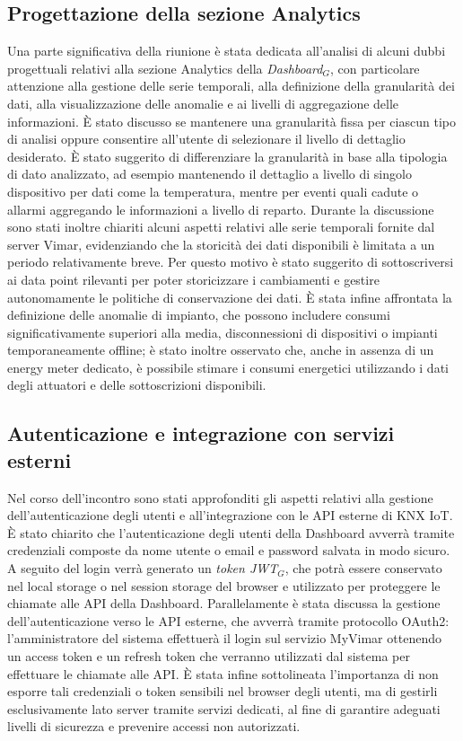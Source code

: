 \documentclass[10pt, letterpaper]{article}
\begin{document}
\subsection{Progettazione della sezione Analytics}
Una parte significativa della riunione è stata dedicata all’analisi di alcuni dubbi progettuali relativi alla sezione Analytics della \textit{Dashboard$_G$}, con particolare attenzione alla gestione delle serie temporali, alla definizione della granularità dei dati, alla visualizzazione delle anomalie e ai livelli di aggregazione delle informazioni.
\noindent
È stato discusso se mantenere una granularità fissa per ciascun tipo di analisi oppure consentire all’utente di selezionare il livello di dettaglio desiderato. È stato suggerito di differenziare la granularità in base alla tipologia di dato analizzato, ad esempio mantenendo il dettaglio a livello di singolo dispositivo per dati come la temperatura, mentre per eventi quali cadute o allarmi aggregando le informazioni a livello di reparto.
\noindent
Durante la discussione sono stati inoltre chiariti alcuni aspetti relativi alle serie temporali fornite dal server Vimar, evidenziando che la storicità dei dati disponibili è limitata a un periodo relativamente breve. Per questo motivo è stato suggerito di sottoscriversi ai data point rilevanti per poter storicizzare i cambiamenti e gestire autonomamente le politiche di conservazione dei dati.
\noindent
È stata infine affrontata la definizione delle anomalie di impianto, che possono includere consumi significativamente superiori alla media, disconnessioni di dispositivi o impianti temporaneamente offline; è stato inoltre osservato che, anche in assenza di un energy meter dedicato, è possibile stimare i consumi energetici utilizzando i dati degli attuatori e delle sottoscrizioni disponibili.


\subsection{Autenticazione e integrazione con servizi esterni}
Nel corso dell’incontro sono stati approfonditi gli aspetti relativi alla gestione dell’autenticazione degli utenti e all’integrazione con le API esterne di KNX IoT.
\noindent
È stato chiarito che l’autenticazione degli utenti della Dashboard avverrà tramite credenziali composte da nome utente o email e password salvata in modo sicuro. A seguito del login verrà generato un \textit{token JWT$_G$}, che potrà essere conservato nel local storage o nel session storage del browser e utilizzato per proteggere le chiamate alle API della Dashboard.
\noindent
Parallelamente è stata discussa la gestione dell’autenticazione verso le API esterne, che avverrà tramite protocollo OAuth2: l’amministratore del sistema effettuerà il login sul servizio MyVimar ottenendo un access token e un refresh token che verranno utilizzati dal sistema per effettuare le chiamate alle API.
\noindent
È stata infine sottolineata l’importanza di non esporre tali credenziali o token sensibili nel browser degli utenti, ma di gestirli esclusivamente lato server tramite servizi dedicati, al fine di garantire adeguati livelli di sicurezza e prevenire accessi non autorizzati.
\end{document}
